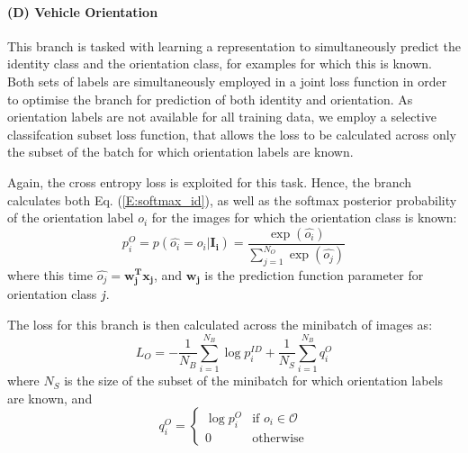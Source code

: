 \documentclass[10pt,twocolumn,letterpaper]{article}
\begin{document}
\paragraph{(D) Vehicle Orientation}

This branch is tasked with learning a representation to simultaneously predict the identity class and the orientation class, for examples for which this is known.
Both sets of labels are simultaneously employed in a joint loss function in order to optimise the branch for prediction of both identity and orientation. As orientation labels are not available for all training data, we employ a selective classifcation subset loss function, that allows the loss to be calculated across only the subset of the batch for which orientation labels are known.

Again, the cross entropy loss is exploited for this task. Hence, the branch calculates both Eq. (\ref{E:softmax_id}), as well as the softmax posterior probability of the orientation label $o_i$ for the images for which the orientation class is known:
\begin{equation}
  p_i^{O} = p(\hat{o_i} = o_i|\mathbf{I_i}) = \frac{\exp(\hat{o_i})}{\sum_{j=1}^{N_{O}}\exp(\hat{o_j})}
\end{equation}
where this time $\hat{o_j} = \mathbf{w_j^Tx_j}$, and $\mathbf{w_j}$ is the prediction function parameter for orientation class $\emph{j}$.

The loss for this branch is then calculated across the minibatch of images as:
\begin{equation}
  L_{O} = -\frac{1}{N_B} \sum_{i=1}^{N_B}\log{p_i^{ID}} + \frac{1}{N_S} \sum_{i=1}^{N_B}q_i^O
\end{equation}
where $N_S$ is the size of the subset of the minibatch for which orientation labels are known, and
\[
q_i^O =
\begin{cases}
    \log{p_i^{O}} & \text{if } o_i \in \mathcal{O} \\
    0 & \text{otherwise}
\end{cases}
\]

\end{document}
